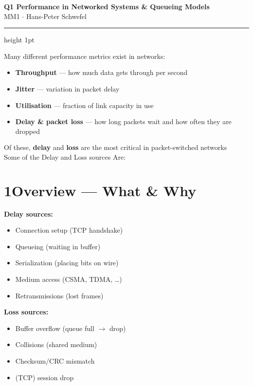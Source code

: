 \documentclass[10pt,a4paper]{article}
\begin{document}

\begin{center}
  {\large\bfseries\color{headernavy}%
    Q1 \textemdash{} Performance in Networked Systems \& Queueing Models}\\[1pt]
  {\small MM1 $\cdot$ Hans-Peter Schwefel}
\end{center}
\vspace{1pt}\hrule height 1pt\vspace{5pt}

Many different performance metrics exist in networks:
\begin{itemize}
  \item \textbf{Throughput} --- how much data gets through per second
  \item \textbf{Jitter} --- variation in packet delay
  \item \textbf{Utilisation} --- fraction of link capacity in use
  \item \textbf{Delay \& packet loss} --- how long packets wait and how often they are dropped
\end{itemize}
Of these, \textbf{delay} and \textbf{loss} are the most critical in packet-switched networks \\[4pt] 
Some of the Delay and Loss sources Are:
\section*{1\quad Overview --- What \& Why}


\vspace{3pt}

\begin{minipage}[t]{0.49\textwidth}
\textbf{Delay sources:}
\begin{itemize}
  \item Connection setup (TCP handshake)
  \item Queueing (waiting in buffer)
  \item Serialization (placing bits on wire)
  \item Medium access (CSMA, TDMA, \ldots)
  \item Retransmissions (lost frames)
\end{itemize}
\end{minipage}\hfill
\begin{minipage}[t]{0.49\textwidth}
\textbf{Loss sources:}
\begin{itemize}
  \item Buffer overflow (queue full $\to$ drop)
  \item Collisions (shared medium)
  \item Checksum/CRC mismatch
  \item (TCP) session drop
\end{itemize}
\end{minipage}
\end{document}
